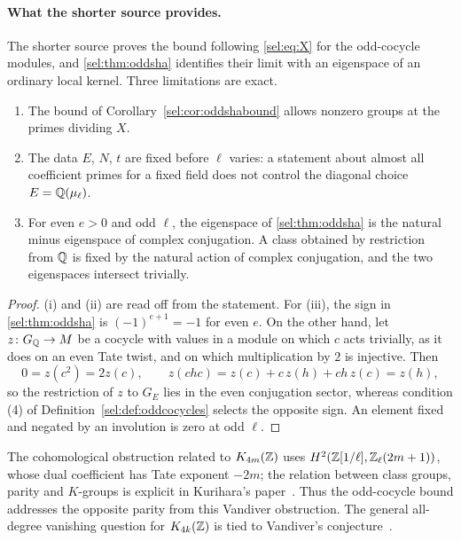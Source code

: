 \paragraph{What the shorter source provides.}
The shorter source proves the bound following \eqref{sel:eq:X} for the
odd-cocycle modules, and \cref{sel:thm:oddsha} identifies their limit with
an eigenspace of an ordinary local kernel. Three limitations are exact.

\begin{proposition}\label{sel:prop:parity}
\leavevmode
\begin{enumerate}[label=\textup{(\roman*)}]
\item The bound of Corollary~\ref{sel:cor:oddshabound} allows nonzero groups at the
primes dividing $X$.
\item The data $E$, $N$, $t$ are fixed before $\ell$ varies: a statement
about almost all coefficient primes for a fixed field does not control the
diagonal choice $E=\mathbb{Q}(\mu_\ell)$.
\item For even $e>0$ and odd $\ell$, the eigenspace of
\cref{sel:thm:oddsha} is the natural minus eigenspace of complex
conjugation. A class obtained by restriction from $\mathbb{Q}$ is fixed by the
natural action of complex conjugation, and the two eigenspaces intersect
trivially.
\end{enumerate}
\end{proposition}

\begin{proof}
(i) and (ii) are read off from the statement. For (iii), the sign in
\cref{sel:thm:oddsha} is $(-1)^{e+1}=-1$ for even $e$. On the other hand,
let $z\colon G_{\mathbb{Q}}\to M$ be a cocycle with values in a module on which $c$
acts trivially, as it does on an even Tate twist, and on which
multiplication by $2$ is injective. Then
\[
 0=z(c^2)=2z(c),\qquad z(chc)=z(c)+c\,z(h)+ch\,z(c)=z(h),
\]
so the restriction of $z$ to $G_E$ lies in the even conjugation sector,
whereas condition (4) of Definition~\ref{sel:def:oddcocycles} selects the opposite
sign. An element fixed and negated by an involution is zero at odd $\ell$.
\end{proof}

The cohomological obstruction related to $K_{4m}(\mathbb{Z})$ uses
$H^2(\mathbb{Z}[1/\ell],\mathbb{Z}_\ell(2m+1))$, whose dual coefficient has Tate exponent
$-2m$; the relation between class groups, parity and $K$-groups is explicit
in Kurihara's paper~\cite{Kurihara1992Remarks}. Thus the odd-cocycle bound
addresses the opposite parity from this Vandiver obstruction. The general
all-degree vanishing question for $K_{4k}(\mathbb{Z})$ is tied to Vandiver's
conjecture~\cite{Weibel2013Kbook}.

